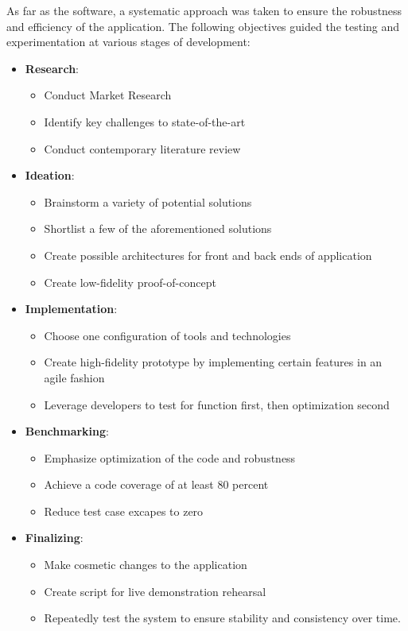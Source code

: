As far as the software, a systematic approach was taken to ensure the
robustness and efficiency of the application.
The following objectives guided the testing and experimentation at various stages of development:

\begin{itemize}
    \item \textbf{Research}:
          \begin{itemize}
              \item Conduct Market Research
              \item Identify key challenges to state-of-the-art
              \item Conduct contemporary literature review
          \end{itemize}
    \item \textbf{Ideation}:
          \begin{itemize}
              \item Brainstorm a variety of potential solutions
              \item Shortlist a few of the aforementioned solutions
              \item Create possible architectures for front and back ends of application
              \item Create low-fidelity proof-of-concept
          \end{itemize}
    \item \textbf{Implementation}:
          \begin{itemize}
              \item Choose one configuration of tools and technologies
              \item Create high-fidelity prototype by implementing certain
                    features in an agile fashion
              \item Leverage developers to test for function first,
                    then optimization second
          \end{itemize}
    \item \textbf{Benchmarking}:
          \begin{itemize}
              \item Emphasize optimization of the code and robustness
              \item Achieve a code coverage of at least 80 percent
              \item Reduce test case excapes to zero
          \end{itemize}
    \item \textbf{Finalizing}:
          \begin{itemize}
              \item Make cosmetic changes to the application
              \item Create script for live demonstration rehearsal
              \item Repeatedly test the system to ensure stability and consistency over time.
          \end{itemize}
\end{itemize}

